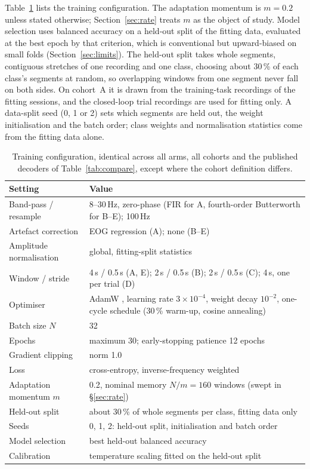 \documentclass[a4paper,fleqn]{cas-dc}
\begin{document}
Table~\ref{tab:hyper} lists the training configuration. The adaptation momentum
is $m=0.2$ unless stated otherwise; Section~\ref{sec:rate} treats $m$ as the
object of study. Model selection uses balanced accuracy on a held-out split of
the fitting data, evaluated at the best epoch by that criterion, which is
conventional but upward-biased on small folds (Section~\ref{sec:limits}). The
held-out split takes whole segments, contiguous stretches of one recording and
one class, choosing about 30\,\% of each class's segments at random, so
overlapping windows from one segment never fall on both sides. On cohort~A it is
drawn from the training-task recordings of the fitting sessions, and the
closed-loop trial recordings are used for fitting only. A data-split seed (0, 1
or 2) sets which segments are held out, the weight initialisation and the batch
order; class weights and normalisation statistics come from the fitting data
alone.

\begin{table}[t]
\caption{Training configuration, identical across all arms, all cohorts and the
published decoders of Table~\ref{tab:compare}, except where the cohort
definition differs.}
\label{tab:hyper}
\centering
\begin{tabular}{@{}l@{\hspace{1em}}p{}@{}}
\toprule
Setting & Value \\
\midrule
Band-pass / resample & 8--30\,Hz, zero-phase (FIR for A, fourth-order Butterworth for B--E); 100\,Hz \\
Artefact correction & EOG regression (A); none (B--E) \\
Amplitude normalisation & global, fitting-split statistics \\
Window / stride & 4\,s / 0.5\,s (A, E); 2\,s / 0.5\,s (B); 2\,s / 0.5\,s (C); 4\,s, one per trial (D) \\
Optimiser & AdamW \citep{adamw}, learning rate $3\times10^{-4}$, weight decay $10^{-2}$, one-cycle schedule (30\,\% warm-up, cosine annealing) \\
Batch size $N$ & 32 \\
Epochs & maximum 30; early-stopping patience 12 epochs \\
Gradient clipping & norm 1.0 \\
Loss & cross-entropy, inverse-frequency weighted \\

Adaptation momentum $m$ & 0.2, nominal memory $N/m = 160$ windows (swept in \S\ref{sec:rate}) \\
Held-out split & about 30\,\% of whole segments per class, fitting data only \\
Seeds & 0, 1, 2: held-out split, initialisation and batch order \\
Model selection & best held-out balanced accuracy \\
Calibration & temperature scaling fitted on the held-out split \\
\bottomrule
\end{tabular}
\end{table}
\end{document}

